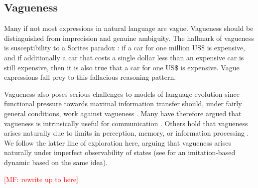 \documentclass[10pt,a4paper]{article}
\newcommand{\mf}[1]{\textcolor{Red}{[MF: #1]}}
\begin{document}

\subsection{Vagueness}

Many if not most expressions in natural language are vague. Vagueness should be distinguished
from imprecision and genuine ambiguity. The hallmark of vagueness is susceptibility to a
Sorites paradox \citep[e.g.][]{Williamson1994:Vagueness}: if a car for one million US\$ is
expensive, and if additionally a car that costs a single dollar less than an expensive car is still expensive,
then it is also true that a car for one US\$ is expensive. Vague expressions fall prey to this fallacious reasoning pattern.

Vagueness also poses serious challenges to models of language evolution since functional
pressure towards maximal information transfer should, under fairly general conditions, work
against vagueness \citep{Lipman2009:Why-is-Language}. Many have therefore argued
that vagueness is intrinsically useful for communication
\citep[e.g.][]{Deemter2009:Utility-and-Lan,Jaegherde-JaegherRooijvan-Rooij2010:Strategic-Vague,BlumeBoard2013:Intentional-Vag}. Others
hold that vagueness arises naturally due to limits in perception, memory, or information
processing
\citep[e.g.][]{FrankeJager2010:Vagueness-Signa,LassiterGoodman2015:Adjectival-vagu,OConnor2013:The-Evolution-o}. We
follow the latter line of exploration here, arguing that vagueness arises naturally under
imperfect observability of states (see \cite{franke+correia:toappear} for an imitation-based
dynamic based on the same idea).

\mf{rewrite up to here}
\end{document}
